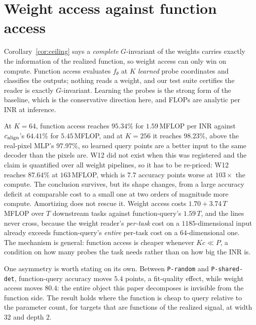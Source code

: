 \section{Weight access against function access}\label{sec:function}

Corollary~\ref{cor:ceiling} says a \emph{complete} $G$-invariant of the weights carries exactly the
information of the realized function, so weight access can only win on compute. Function access
evaluates $f_\theta$ at $K$ \emph{learned} probe coordinates and classifies the outputs; nothing
reads a weight, and our test suite certifies the reader is exactly $G$-invariant. Learning the
probes is the strong form of the baseline, which is the conservative direction here, and FLOPs are
analytic per INR at inference.

At $K = 64$, function access reaches $95.34\%$ for $1.59$\,MFLOP per INR against $c_{\mathrm{align}}$'s
$64.41\%$ for $5.45$\,MFLOP, and at $K = 256$ it reaches $98.23\%$, above the real-pixel MLP's
$97.97\%$, so learned query points are a better input to the same decoder than the pixels are. W12
did not exist when this was registered and the claim is quantified over all weight pipelines, so it
has to be re-priced: W12 reaches $87.64\%$ at $163$\,MFLOP, which is $7.7$ accuracy points worse at
$103\times$ the compute. The conclusion survives, but its shape changes, from a large accuracy
deficit at comparable cost to a small one at two orders of magnitude more compute. Amortizing does
not rescue it. Weight access costs $1.70 + 3.74\,T$\,MFLOP over $T$ downstream tasks against
function-query's $1.59\,T$, and the lines never cross, because the weight reader's \emph{per-task}
cost on a $1185$-dimensional input already exceeds function-query's \emph{entire} per-task cost on a
$64$-dimensional one. The mechanism is general: function access is cheaper whenever $Kc \ll P$, a
condition on how many probes the task needs rather than on how big the INR is.

One asymmetry is worth stating on its own. Between \texttt{P-random} and \texttt{P-shared-det},
function-query accuracy moves $5.4$ points, a fit-quality effect, while weight access moves $80.4$:
the entire object this paper decomposes is invisible from the function side. The result holds where
the function is cheap to query relative to the parameter count, for targets that are functions of
the realized signal, at width $32$ and depth $2$.
